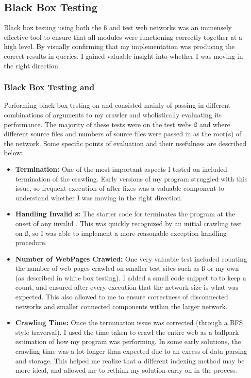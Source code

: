 \documentclass[11pt]{article}
\begin{document}
\subsection{Black Box Testing}
Black box testing using both the \ss{} and \rhf{} test web networks was an immensely effective tool to ensure that all modules were functioning correctly together at a high level. By visually confirming that my implementation was producing the correct results in \WS{} queries, I gained valuable insight into whether I was moving in the right direction.
\subsubsection{Black Box Testing \WC{} and \CMH{}}
Performing black box testing on \WC{} and \CMH{} consisted mainly of passing in different combinations of arguments to my crawler and wholistically evaluating its performance. The majority of these tests were on the test webs \ss{} and \rhf{} where different source files and numbers of source files were passed in as the root(s) of the network. Some specific points of evaluation and their usefulness are described below:
\begin{itemize}
	\item \textbf{Termination: } One of the most important aspects I tested on included termination of the crawling. Early versions of my program struggled with this issue, so frequent execution of \WC{} after fixes was a valuable component to understand whether I was moving in the right direction.
	\item \textbf{Handling Invalid \URL s: } The starter code for \WC{} terminates the program at the onset of any invalid \URL. This was quickly recognized by an initial crawling test on \ss{}, so I was able to implement a more reasonable exception handling procedure.   
	\item \textbf{Number of WebPages Crawled: } One very valuable test included counting the number of web pages crawled on smaller test sites such as \ss{} or my own (as described in white box testing). I added a small code snippet to \WC{} to keep a count, and ensured after every execution that the network size is what was expected. This also allowed to me to ensure correctness of disconnected networks and smaller connected components within the larger network. 
	\item \textbf{Crawling Time: } Once the termination issue was corrected (through a BFS style traversal), I used the time taken to crawl the entire web as a ballpark estimation of how my program was performing. In some early solutions, the crawling time was a lot longer than expected due to an excess of data parsing and storage. This helped me realize that a different indexing method may be more ideal, and allowed me to rethink my solution early on in the process.

\end{itemize}
\end{document}
